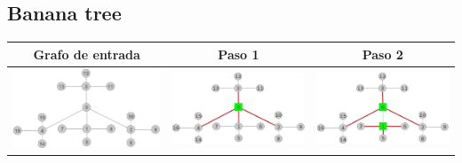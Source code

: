\subsection{Banana tree}
	\begin{center}
		\begin{tabular}{ |c||c|c| }
			\hline
			Grafo de entrada & Paso 1 & Paso 2 \\
			\hline\hline
			\includegraphics[scale = 0.2]{img/ej3/constructiva_golosa/banana4,4_st0.png} &
			\includegraphics[scale = 0.2]{img/ej3/constructiva_golosa/banana4,4_st1.png} & 
			\includegraphics[scale = 0.2]{img/ej3/constructiva_golosa/banana4,4_st2.png} \\

\end{tabular}
\end{center}
